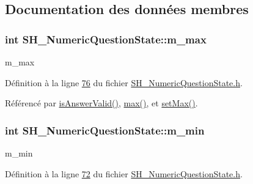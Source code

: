 \subsection{Documentation des données membres}
\hypertarget{classSH__NumericQuestionState_a7c30cee8a2ff7807e9c9af7916a0ec24}{
\subsubsection[{m\-\_\-max}]{\setlength{\rightskip}{0pt plus 5cm}int S\-H\-\_\-\-Numeric\-Question\-State\-::m\-\_\-max\hspace{0.3cm}{\ttfamily [private]}}}\label{classSH__NumericQuestionState_a7c30cee8a2ff7807e9c9af7916a0ec24}


m\-\_\-max 



Définition à la ligne \hyperlink{SH__NumericQuestionState_8h_source_l00076}{76} du fichier \hyperlink{SH__NumericQuestionState_8h_source}{S\-H\-\_\-\-Numeric\-Question\-State.\-h}.



Référencé par \hyperlink{classSH__NumericQuestionState_afa783a2ebc3875bc6b8c3d823e24e30b}{is\-Answer\-Valid()}, \hyperlink{classSH__NumericQuestionState_ac042a94900f79aba298fb013e3ec059b}{max()}, et \hyperlink{classSH__NumericQuestionState_aced35da171964ceffc22ed7d6f6a7a9f}{set\-Max()}.

\hypertarget{classSH__NumericQuestionState_a4e5fe957a054249989acc1efbb79c6d8}{
\subsubsection[{m\-\_\-min}]{\setlength{\rightskip}{0pt plus 5cm}int S\-H\-\_\-\-Numeric\-Question\-State\-::m\-\_\-min\hspace{0.3cm}{\ttfamily [private]}}}\label{classSH__NumericQuestionState_a4e5fe957a054249989acc1efbb79c6d8}


m\-\_\-min 



Définition à la ligne \hyperlink{SH__NumericQuestionState_8h_source_l00072}{72} du fichier \hyperlink{SH__NumericQuestionState_8h_source}{S\-H\-\_\-\-Numeric\-Question\-State.\-h}.



